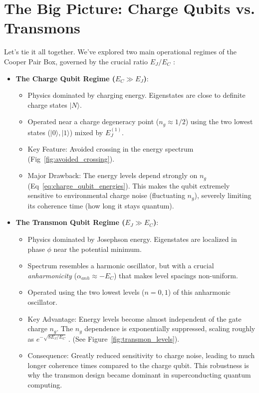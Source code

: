 \documentclass{book}
\begin{document}
\section{The Big Picture: Charge Qubits vs. Transmons}
\label{sec:interpretation}

Let's tie it all together. We've explored two main operational regimes of the Cooper Pair Box, governed by the crucial ratio \(E_J / E_C\) \cite{Kjaergaard2020}:

\begin{itemize}
    \item \textbf{The Charge Qubit Regime (\(E_C \gg E_J\))}:
        \begin{itemize}
            \item Physics dominated by charging energy. Eigenstates are close to definite charge states \(|N\rangle\).
            \item Operated near a charge degeneracy point (\(n_g \approx 1/2\)) using the two lowest states (\(|0\rangle, |1\rangle\)) mixed by \(E_J^{(1)}\).
            \item Key Feature: Avoided crossing in the energy spectrum (Fig~\ref{fig:avoided_crossing}).
            \item Major Drawback: The energy levels depend strongly on \(n_g\) (Eq~\ref{eq:charge_qubit_energies}). This makes the qubit extremely sensitive to environmental charge noise (fluctuating \(n_g\)), severely limiting its coherence time (how long it stays quantum).
        \end{itemize}

    \item \textbf{The Transmon Qubit Regime (\(E_J \gg E_C\))}:
        \begin{itemize}
            \item Physics dominated by Josephson energy. Eigenstates are localized in phase \(\phi\) near the potential minimum.
            \item Spectrum resembles a harmonic oscillator, but with a crucial \textit{anharmonicity} (\(\alpha_{anh} \approx -E_C\)) that makes level spacings non-uniform.
            \item Operated using the two lowest levels (\(n=0, 1\)) of this anharmonic oscillator.
            \item Key Advantage: Energy levels become almost independent of the gate charge \(n_g\). The \(n_g\) dependence is exponentially suppressed, scaling roughly as \(e^{-\sqrt{8 E_J / E_C}}\) \cite{Koch2007}. (See Figure~\ref{fig:transmon_levels}).
            \item Consequence: Greatly reduced sensitivity to charge noise, leading to much longer coherence times compared to the charge qubit. This robustness is why the transmon design became dominant in superconducting quantum computing.
        \end{itemize}
\end{itemize}
\end{document}
